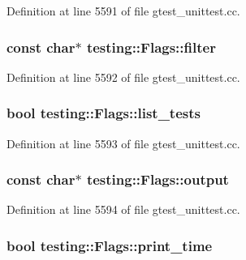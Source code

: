 Definition at line 5591 of file gtest\+\_\+unittest.\+cc.

\subsubsection[{\texorpdfstring{filter}{filter}}]{\setlength{\rightskip}{0pt plus 5cm}const char$\ast$ testing\+::\+Flags\+::filter}\hypertarget{structtesting_1_1_flags_aa52c1048a7e3cbe726ed4160f2e05d14}{}\label{structtesting_1_1_flags_aa52c1048a7e3cbe726ed4160f2e05d14}


Definition at line 5592 of file gtest\+\_\+unittest.\+cc.

\subsubsection[{\texorpdfstring{list\+\_\+tests}{list_tests}}]{\setlength{\rightskip}{0pt plus 5cm}bool testing\+::\+Flags\+::list\+\_\+tests}\hypertarget{structtesting_1_1_flags_a3c73f29131074146224018066379fb2f}{}\label{structtesting_1_1_flags_a3c73f29131074146224018066379fb2f}


Definition at line 5593 of file gtest\+\_\+unittest.\+cc.

\subsubsection[{\texorpdfstring{output}{output}}]{\setlength{\rightskip}{0pt plus 5cm}const char$\ast$ testing\+::\+Flags\+::output}\hypertarget{structtesting_1_1_flags_a8c8289b3af9310744bc25280e3980e4b}{}\label{structtesting_1_1_flags_a8c8289b3af9310744bc25280e3980e4b}


Definition at line 5594 of file gtest\+\_\+unittest.\+cc.

\subsubsection[{\texorpdfstring{print\+\_\+time}{print_time}}]{\setlength{\rightskip}{0pt plus 5cm}bool testing\+::\+Flags\+::print\+\_\+time}\hypertarget{structtesting_1_1_flags_a8758d574ce5513402679df258f788733}{}\label{structtesting_1_1_flags_a8758d574ce5513402679df258f788733}


